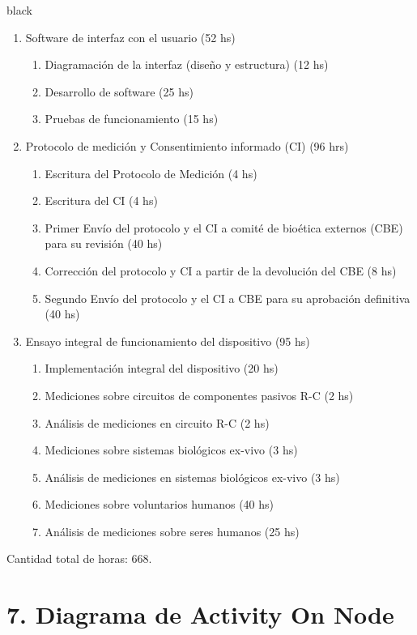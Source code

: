 \documentclass[11pt]{charter}
\begin{document}
\begin{consigna}{black}
\begin{enumerate}
\item Software de interfaz con el usuario (52 hs) 
	\begin{enumerate}
	\item Diagramación de la interfaz (diseño y estructura) (12 hs)
	\item Desarrollo de software (25 hs)
	\item Pruebas de funcionamiento (15 hs)
	\end{enumerate}

\item Protocolo de medición y Consentimiento informado (CI) (96 hrs)
	\begin{enumerate}
	\item Escritura del Protocolo de Medición (4 hs)
	\item Escritura del CI (4 hs)
	\item Primer Envío del protocolo y el CI a comité de bioética externos (CBE) para su revisión (40 hs)
	\item Corrección del protocolo y CI a partir de la devolución del CBE (8 hs)
	\item Segundo Envío del protocolo y el CI a CBE para su aprobación definitiva (40 hs)
	\end{enumerate}

\item Ensayo integral de funcionamiento del dispositivo (95 hs)
	\begin{enumerate}
	\item Implementación integral del dispositivo (20 hs)
	\item Mediciones sobre circuitos de componentes pasivos R-C (2 hs)
	\item Análisis de mediciones en circuito R-C (2 hs)
	\item Mediciones sobre sistemas biológicos ex-vivo (3 hs)
	\item Análisis de mediciones en sistemas biológicos ex-vivo (3 hs)
	\item Mediciones sobre voluntarios humanos (40 hs)
	\item Análisis de mediciones sobre seres humanos (25 hs)
	\end{enumerate}
	
\end{enumerate}

Cantidad total de horas: 668.

\end{consigna}

\pagebreak

\section{7. Diagrama de Activity On Node}
\label{sec:AoN}
\end{document}
